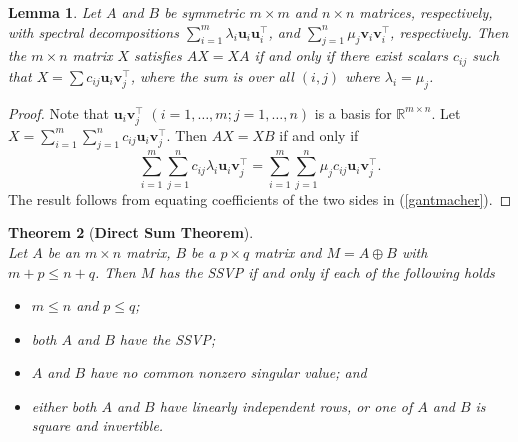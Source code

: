 \documentclass[preprint,12pt]{elsarticle}
\newcommand{\trans  }{^\top}
\newtheorem{theorem}{Theorem}[section]
\newtheorem{lemma}[theorem]{Lemma}
\begin{document}
\begin{lemma}
\label{sylvester}
Let $A$ and $B$ be symmetric $m\times m$ and $n\times n$ 
matrices, respectively, with spectral decompositions
$\sum_{i=1}^m \lambda_i \mathbf u_i \mathbf u_i\trans$, 
and 
$\sum_{j=1}^n \mu_j\mathbf v_i \mathbf v_i\trans$, respectively.  Then the $m\times n$ matrix $X$ 
satisfies $AX=XA$ if and only if there exist scalars
$c_{ij}$ such that $X=\sum c_{ij} \mathbf u_i \mathbf v_j\trans$, where the sum is over all $(i,j)$ where 
$\lambda_i=\mu_j$.
\end{lemma}

\begin{proof}
Note that $\mathbf u_i \mathbf v_j\trans$ $(i=1,\ldots, m; j=1,\ldots, n)$ is a basis for $\mathbb{R}^{m\times n}$.
Let $X= \sum_{i=1}^m\sum_{j=1}^n c_{ij} \mathbf u_i \mathbf v_j\trans$.  Then $AX=XB$ if and only if 
\begin{equation}
\label{gantmacher}
\sum_{i=1}^m\sum_{j=1}^n c_{ij}\lambda_i \mathbf u_i \mathbf v_j\trans= \sum_{i=1}^m\sum_{j=1}^n \mu_jc_{ij} \mathbf u_i \mathbf v_j\trans.
\end{equation}
The result follows from equating coefficients of the two sides in (\ref{gantmacher}).
\end{proof}



\begin{theorem}[\bf Direct Sum Theorem]
\label{dsum}
\phantom{ }\\
Let $A$ be an $m\times n$ matrix, $B$ be a $p \times q$ matrix and $M=A\oplus B$ with $m+p \leq n+q$.
Then $M$ has the SSVP if and only if  each of the following holds
\begin{itemize}
\item[\rm (a)] 
$ m \leq n$ and $p\leq q$;
\item[\rm (b)] 
both $A$ and $B$ have the SSVP; 
\item[\rm (c)] $A$ and $B$ have no common nonzero singular value; and
\item[\rm (d)] either both $A$ and $B$
have linearly independent rows, or one of $A$ and $B$ is square and invertible.
\end{itemize}
\end{theorem}
\end{document}
